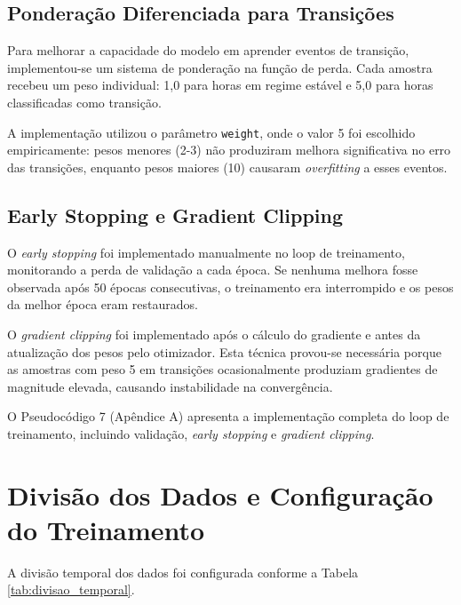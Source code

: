
\subsection{Ponderação Diferenciada para Transições}

Para melhorar a capacidade do modelo em aprender eventos de transição, implementou-se um sistema de ponderação na função de perda. Cada amostra recebeu um peso individual: 1,0 para horas em regime estável e 5,0 para horas classificadas como transição.

A implementação utilizou o parâmetro \texttt{weight}, onde o valor 5 foi escolhido empiricamente: pesos menores (2-3) não produziram melhora significativa no erro das transições, enquanto pesos maiores (10) causaram \textit{overfitting} a esses eventos.

\subsection{Early Stopping e Gradient Clipping}

O \textit{early stopping} foi implementado manualmente no loop de treinamento, monitorando a perda de validação a cada época. Se nenhuma melhora fosse observada após 50 épocas consecutivas, o treinamento era interrompido e os pesos da melhor época eram restaurados.

O \textit{gradient clipping} foi implementado após o cálculo do gradiente e antes da atualização dos pesos pelo otimizador. Esta técnica provou-se necessária porque as amostras com peso 5 em transições ocasionalmente produziam gradientes de magnitude elevada, causando instabilidade na convergência.

O Pseudocódigo 7 (Apêndice A) apresenta a implementação completa do loop de treinamento, incluindo validação, \textit{early stopping} e \textit{gradient clipping}.

\section{Divisão dos Dados e Configuração do Treinamento}

A divisão temporal dos dados foi configurada conforme a Tabela \ref{tab:divisao_temporal}.


